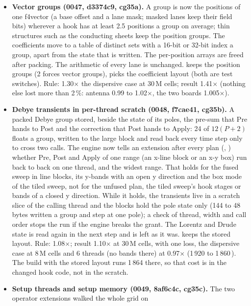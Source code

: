 \begin{itemize}
\item \textbf{Vector groups (0047, d3374c9, cg35a).} A group is now the positions of one f4vector (a base offset and a lane
  mask; masked lanes keep their field bits) wherever a hook has at least 2.5 positions a group on average; thin structures
  such as the conducting sheets keep the position groups. The coefficients move to a table of distinct sets with a 16-bit
  or 32-bit index a group, apart from the state that is written. The per-position arrays are freed after packing. The
  arithmetic of every lane is unchanged.  keeps the position groups (2 forces vector groups),
   picks the coefficient layout (both are test switches). Rule: 1.30$\times$ the dispersive case at 30\,M cells;
  result 1.41$\times$ (nothing else lost more than 2\,\%: antenna 0.99 to 1.02$\times$, the two boards 1.005$\times$).
\item \textbf{Debye transients in per-thread scratch (0048, f7cae41, cg35b).} A packed Debye group stored, beside the
  state of its poles, the pre-sum that Pre hands to Post and the correction that Post hands to Apply: 24 of $12(P+2)$ floats a group, written to the large
  block and read back every time step only to cross two calls. The engine now tells an extension after every plan
  (, ) whether Pre, Post and Apply of one range (an x-line block or an x-y box) run
  back to back on one thread, and the widest range. That holds for the fused sweep in line blocks, its y-bands with an
  open y direction and the box mode of the tiled sweep, not for the unfused plan, the tiled sweep's hook stages or bands of a
  closed y direction. While it holds, the transients live in a scratch slice of the calling thread and the blocks hold the pole
  state only (144 to 48 bytes written a group and step at one pole); a check of thread, width and call order stops the run if the engine breaks the grant. The
  Lorentz and Drude state is read again in the next step and is left as it was.  keeps the stored layout. Rule: 1.08$\times$; result 1.10$\times$ at 30\,M cells, with one loss, the dispersive case at 8\,M cells and 6 threads (no bands there) at
  0.97$\times$ (1\,920 to 1\,860\,\MC). The build with the stored layout runs 1\,864 there, so that cost is in the changed
  hook code, not in the scratch.
\item \textbf{Setup threads and setup memory (0049, 8af6c4c, cg35c).} The two operator extensions walked the whole grid on

\end{itemize}
